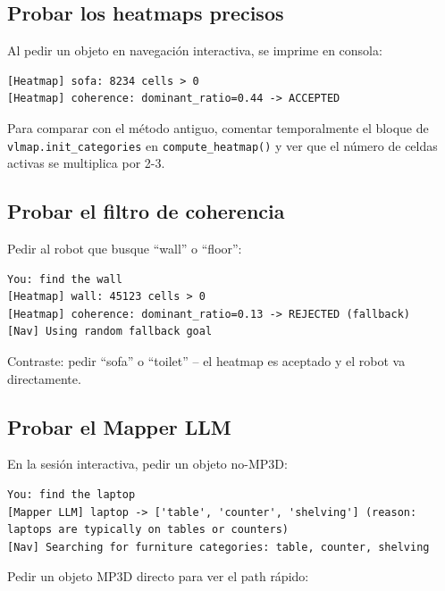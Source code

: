 \documentclass[11pt,a4paper]{article}
\begin{document}
\subsection{Probar los heatmaps precisos}

Al pedir un objeto en navegación interactiva, se imprime en consola:

\begin{lstlisting}
[Heatmap] sofa: 8234 cells > 0
[Heatmap] coherence: dominant_ratio=0.44 -> ACCEPTED
\end{lstlisting}

Para comparar con el método antiguo, comentar temporalmente el bloque de
\texttt{vlmap.init\_categories} en \texttt{compute\_heatmap()} y ver que el
número de celdas activas se multiplica por 2-3.

\subsection{Probar el filtro de coherencia}

Pedir al robot que busque ``wall'' o ``floor'':

\begin{lstlisting}
You: find the wall
[Heatmap] wall: 45123 cells > 0
[Heatmap] coherence: dominant_ratio=0.13 -> REJECTED (fallback)
[Nav] Using random fallback goal
\end{lstlisting}

Contraste: pedir ``sofa'' o ``toilet'' -- el heatmap es aceptado y el robot va directamente.

\subsection{Probar el Mapper LLM}

En la sesión interactiva, pedir un objeto no-MP3D:

\begin{lstlisting}
You: find the laptop
[Mapper LLM] laptop -> ['table', 'counter', 'shelving'] (reason: laptops are typically on tables or counters)
[Nav] Searching for furniture categories: table, counter, shelving
\end{lstlisting}

Pedir un objeto MP3D directo para ver el path rápido:
\end{document}
